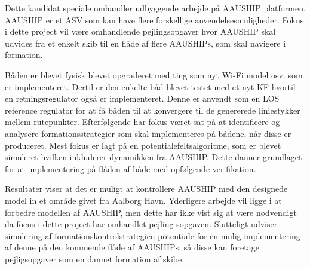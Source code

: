 Dette kandidat speciale omhandler udbyggende arbejde på AAUSHIP platformen. AAUSHIP er et \ac{ASV} som kan have flere forskellige anvendelsesmuligheder. Fokus i dette project vil være omhandlende pejlingsopgaver hvor AAUSHIP skal udvides fra et enkelt skib til en flåde af flere AAUSHIPs, som skal navigere i formation.

Båden er blevet fysisk blevet opgraderet med ting som nyt Wi-Fi model osv. som er implementeret. Dertil er den enkelte båd blevet testet med et nyt \ac{KF} hvortil en retningsregulator også er implementeret. Denne er anvendt som en \ac{LOS} reference regulator for at få båden til at konvergere til de genererede liniestykker mellem rutepunkter. Efterfølgende har fokus været sat på at identificere og analysere formationsstrategier som skal implementeres på bådene, når disse er produceret. Mest fokus er lagt på en potentialefeltsalgoritme, som er blevet simuleret hvilken inkluderer dynamikken fra AAUSHIP. Dette danner grundlaget for at implementering på flåden af både med opfølgende verifikation.

Resultater viser at det er muligt at kontrollere AAUSHIP med den designede model in et område givet fra Aalborg Havn. Yderligere arbejde vil ligge i at forbedre modellen af AAUSHIP, men dette har ikke vist sig at være nødvendigt da focus i dette project har omhandlet pejling sopgaven. Slutteligt udviser simulering af formationskontrolstrategien potentiale for en mulig implementering af denne på den kommende flåde af AAUSHIPs, så disse kan foretage pejligsopgaver som en dannet formation af skibe.